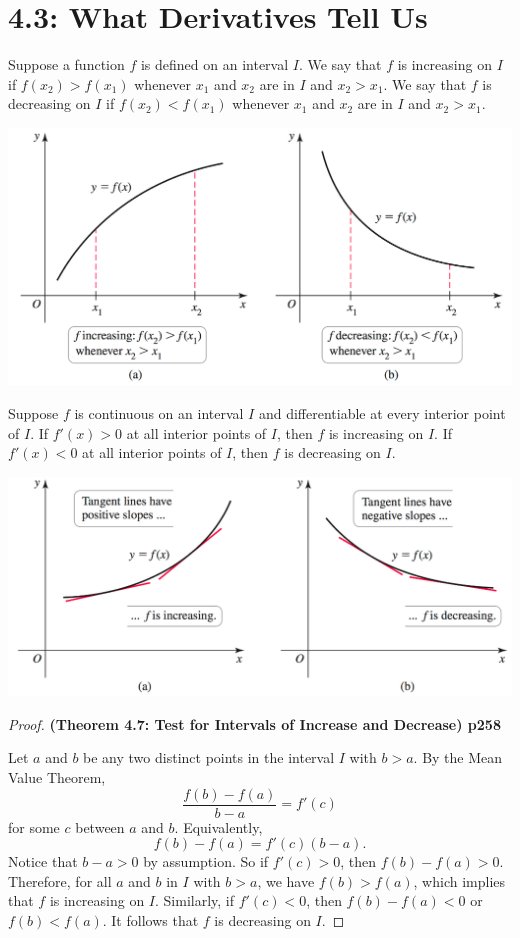 \documentclass[../mathNotesPreamble]{subfiles}
\begin{document}
\section{4.3: What Derivatives Tell Us}
\begin{defn*}
  Suppose a function $f$ is defined on an interval $I$. We say that $f$ is increasing on $I$ if $f(x_2)>f(x_1)$ whenever $x_1$ and $x_2$ are in $I$ and $x_2>x_1$. We say that $f$ is decreasing on $I$ if $f(x_2)<f(x_1)$ whenever $x_1$ and $x_2$ are in $I$ and $x_2>x_1$.
\end{defn*}
\begin{center}
  \includegraphics[width=0.625\linewidth]{../images/briggs_04_03/fig4_20.png}
\end{center}

\begin{thmBox*}
  Suppose $f$ is continuous on an interval $I$ and differentiable at every interior point of $I$. If $f'(x)>0$ at all interior points of $I$, then $f$ is increasing on $I$. If $f'(x)<0$ at all interior points of $I$, then $f$ is decreasing on $I$.
\end{thmBox*}

\begin{center}
  \includegraphics[width=0.625\linewidth]{../images/briggs_04_03/fig4_21.png}
\end{center}
\pagebreak
\begin{proof}
  \textbf{(Theorem 4.7: Test for Intervals of Increase and Decrease) p258}

  Let $a$ and $b$ be any two distinct points in the interval $I$ with $b>a$. By the Mean Value Theorem, 
    $$\frac{f(b)-f(a)}{b-a}=f'(c)$$
  for some $c$ between $a$ and $b$. Equivalently,
    $$f(b)-f(a)=f'(c)(b-a).$$
  Notice that $b-a>0$ by assumption. So if $f'(c)>0$, then $f(b)-f(a)>0$. Therefore, for all $a$ and $b$ in $I$ with $b>a$, we have $f(b)>f(a)$, which implies that $f$ is increasing on $I$. Similarly, if $f'(c)<0$, then $f(b)-f(a)<0$ or $f(b)<f(a)$. It follows that $f$ is decreasing on $I$.
\end{proof}
\end{document}
